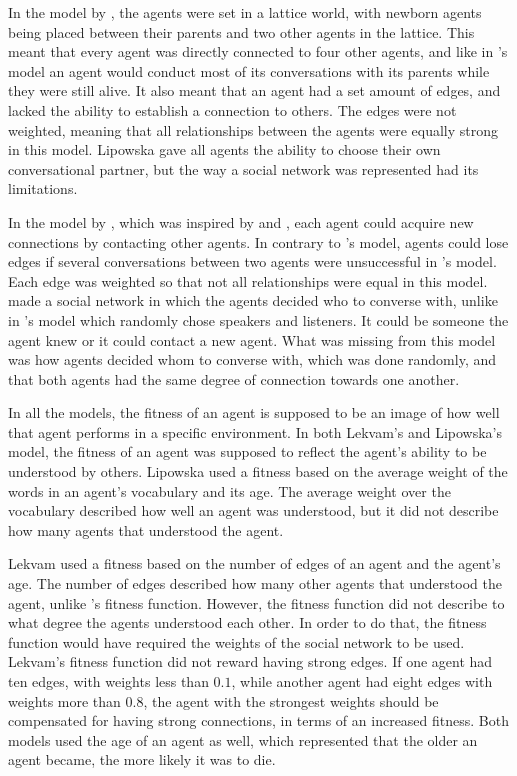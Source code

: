 In the model by \citet{lipowska2011naming}, the agents were set in a lattice world, with newborn agents being placed between their parents and two other agents in the lattice. This meant that every agent was directly connected to four other agents, and like in \citeauthor{munroe2002learning}'s model an agent would conduct most of its conversations with its parents while they were still alive. It also meant that an agent had a set amount of edges, and lacked the ability to establish a connection to others. The edges were not weighted, meaning that all relationships between the agents were equally strong in this model. Lipowska gave all agents the ability to choose their own conversational partner, but the way a social network was represented had its limitations. 

In the model by \citep{lekvam2014co}, which was inspired by \citet{lipowska2011naming} and \citet{quillinan2006social}, each agent could acquire new connections by contacting other agents. In contrary to \citeauthor{lipowska2011naming}'s model, agents could lose edges if several conversations between two agents were unsuccessful in \citeauthor{lekvam2014co}'s model. Each edge was weighted so that not all relationships were equal in this model. \citeauthor{lekvam2014co} made a social network in which the agents decided who to converse with, unlike in \citeauthor{gong2011simulating}'s model which randomly chose speakers and listeners. It could be someone the agent knew or it could contact a new agent. What was missing from this model was how agents decided whom to converse with, which was done randomly, and that both agents had the same degree of connection towards one another. 

In all the models, the fitness of an agent is supposed to be an image of how well that agent performs in a specific environment. In both Lekvam’s and Lipowska’s model, the fitness of an agent was supposed to reflect the agent’s ability to be understood by others. Lipowska used a fitness based on the average weight of the words in an agent’s vocabulary and its age. The average weight over the vocabulary described how well an agent was understood, but it did not describe how many agents that understood the agent. 

Lekvam used a fitness based on the number of edges of an agent and the agent’s age. The number of edges described how many other agents that understood the agent, unlike \citeauthor{lipowska2011naming}'s fitness function. However, the fitness function did not describe to what degree the agents understood each other. In order to do that, the fitness function would have required the weights of the social network to be used. Lekvam’s fitness function did not reward having strong edges. If one agent had ten edges, with weights less than $0.1$, while another agent had eight edges with weights more than $0.8$, the agent with the strongest weights should be compensated for having strong connections, in terms of an increased fitness. Both models used the age of an agent as well, which represented that the older an agent became, the more likely it was to die. 

